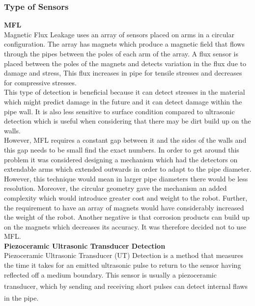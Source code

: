 \documentclass[11pt]{article}		%
\newcommand{\supercite}[1]{\textsuperscript{\cite{#1}}}		%
\begin{document}
	        \subsubsection{Type of Sensors}
	        \textbf{MFL}
	        \\
	        Magnetic Flux Leakage uses an array of sensors placed on arms in a circular configuration. 
	        The array has magnets which produce a magnetic field that flows through the pipes between the poles of each arm of the array.
	        A flux sensor is placed between the poles of the magnets and detects variation in the flux due to damage and stress,
	        This flux increases in pipe for tensile stresses and decreases for compressive stresses.
	        \\
	        This type of detection is beneficial because it can detect stresses in the material which might predict damage in the future and it can detect damage within the pipe wall.
	        It is also less sensitive to surface condition compared to ultrasonic detection which is useful when considering that there may be dirt build up on the walls.
	        \\
	        However, MFL requires a constant gap between it and the sides of the walls and this gap needs to be small find the exact numbers. 
	        In order to get around this problem it was considered designing a mechanism which had the detectors on extendable arms which extended outwards in order to adapt to the pipe diameter. 
	        However, this technique would mean in larger pipe diameters there would be less resolution. 
	        Moreover, the circular geometry gave the mechanism an added complexity which would introduce greater cost and weight to the robot. 
	        Further, the requirement to have an array of magnets would have considerably increased the weight of the robot. %
	        Another negative is that corrosion products can build up on the magnets which decreases its accuracy. It was therefore decided not to use MFL.
	        \\
	        \textbf{Piezoceramic Ultrasonic Transducer Detection}
	        \\
	        Piezoceramic Ultrasonic Transducer (UT) Detection is a method that measures the time it takes for an emitted ultrasonic pulse to return to the sensor having reflected off a medium boundary. 
	        This sensor is usually a piezoceramic transducer\supercite{UT}, which by sending and receiving short pulses can detect internal flaws in the pipe.\supercite{Corrosion}
\end{document}
